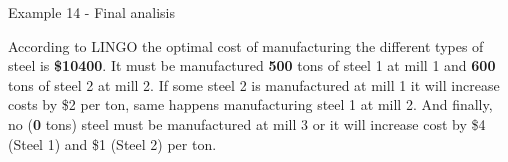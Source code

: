 \begin{frame}{Example 14 - Final analisis}

According to LINGO the optimal cost of manufacturing the different types of
steel is \textbf{\$10400}. It must be manufactured \textbf{500} tons of steel 1
at mill 1 and \textbf{600} tons of steel 2 at mill 2. If some steel 2 is
manufactured at mill 1 it will increase costs by \$2 per ton, same happens
manufacturing steel 1 at mill 2. And finally, no (\textbf{0} tons) steel must
be manufactured at mill 3 or it will increase cost by \$4 (Steel 1) and \$1
(Steel 2) per ton.

\end{frame}
